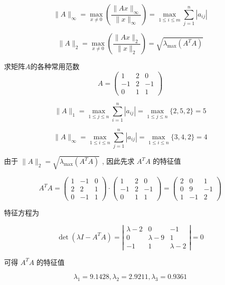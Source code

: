 \begin{definition}[$A$的行范数]
    $$ \|A\|_{\infty}=\max _{x \neq 0}\left( \frac{\|A x\|_{\infty}}{\|x\|_{\infty}}    \right)=\max _{1 \leq i \leq m} \sum_{j=1}^{n}\left|a_{i j}\right| $$
\end{definition}

\begin{definition}[$A$的2−范数]
    $$ \|A\|_{2}=\max _{x \neq 0}\left( \frac{\|A x\|_{2}}{\|x\|_{2}}  \right)=\sqrt{\lambda_{\max }\left(A^{T} A\right)} $$
\end{definition}

\begin{example}
    求矩阵$A$的各种常用范数
$$
A=\left(\begin{array}{ccc}
1 & 2 & 0 \\
-1 & 2 & -1 \\
0 & 1 & 1
\end{array}\right)
$$

$$ \|A\|_{1}=\max _{1 \leq j \leq n} \sum_{i=1}^{n}\left|a_{i j}\right|=\max _{1 \leq j \leq n}\{2,5,2\}=5 $$

$$ \|A\|_{\infty}=\max _{1 \leq i \leq n} \sum_{j=1}^{n}\left|a_{i j}\right|=\max _{1 \leq i \leq n}\{3,4,2\}=4 $$

由于 $ \|A\|_{2}=\sqrt{\lambda_{\max }\left(A^{T} A\right)} $
, 因此先求 $ A^{T} A $ 的特征值

$$ A^{T} A=\left(\begin{array}{ccc}1 & -1 & 0 \\ 2 & 2 & 1 \\ 0 & -1 & 1\end{array}\right) \cdot\left(\begin{array}{ccc}1 & 2 & 0 \\ -1 & 2 & -1 \\ 0 & 1 & 1\end{array}\right)=\left(\begin{array}{ccc}2 & 0 & 1 \\ 0 & 9 & -1 \\ 1 & -1 & 2\end{array}\right) $$

特征方程为

$$ \operatorname{det}\left(\lambda I-A^{T} A\right)=\left|\begin{array}{ccc}\lambda-2 & 0 & -1 \\ 0 & \lambda-9 & 1 \\ -1 & 1 & \lambda-2\end{array}\right|=0 $$

可得 $ A^{T} A $ 的特征值

$$ \lambda_{1}=9.1428, \lambda_{2}=2.9211, \lambda_{3}=0.9361 $$

\end{example}

